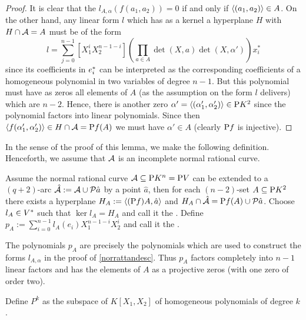 \begin{proof}
    It is clear that the $l_{A,\alpha}(f(a_1,a_2))=0$ if and only if $\gen{(a_1,a_2)}\in A$. On the other hand, any linear form $l$ which has as a kernel a hyperplane $H$ with $H\cap\mathcal{A}=A$ must be of the form
    $$
    l=\sum_{j=0}^{n-1}{[X_1^i X_2^{n-1-i}]\left(\prod_{a\in A}{\det(X,a)}\det(X,\alpha')\right)x_i^{\ast}}
    $$
    since its coefficients in $e^{\ast}_i$ can be interpreted as the corresponding coefficients of a homogeneous polynomial in two variables of degree $n-1$. But this polynomial must have as zeros all elements of $A$ (as the assumption on the form $l$ delivers) which are $n-2$. Hence, there is another zero $\alpha'=\gen{(\alpha'_1,\alpha'_2)}\in\proj{K^2}$ since the polynomial factors into linear polynomials. Since then $\gen{f(\alpha'_1,\alpha'_2)}\in H\setmeet\cA=\proj f(A)$ we must have $\alpha'\in A$ (clearly $\mathrm{P} f$ is injective).
    
\end{proof}

In the sense of the proof of this lemma, we make the following definition.
Henceforth, we assume that $\mathcal{A}$ is an incomplete normal rational curve.

\begin{definition}
    Assume the normal rational curve $\mathcal{A}\subseteq \mathrm{P}{K^n}=\mathrm{P}{V}$ can be extended to a $(q+2)$-arc $\hat{\cA}:=\cA\setjoin\set{\hat{a}}$ by a point $\hat a$, then for each $(n-2)$-set $A\subseteq\mathrm{P}{K^2}$ there exists a hyperplane $H_A:=\gen{(\proj f)A,\hat{a}}$ and $H_A\setmeet \hat{\cA}=\proj f(A)\setjoin\set{\hat{a}}$. Choose $l_A\in V^{\ast}$ such that $\ker{l_A}=H_A$ and call it the .
    Define $p_A:=\sum_{i=0}^{n-1}{l_A(e_i)X_1^{n-1-i}X_2^i}$ and call it the .
\end{definition}

\begin{remark}
    The polynomials $p_A$ are precisely the polynomials which are used to construct the forms $l_{A,\alpha}$ in the proof of \autoref{norrattandesc}. Thus $p_A$ factors completely into $n-1$ linear factors and has the elements of $A$ as a projective zeros (with one zero of order two).
\end{remark}

\begin{definition}
    Define $P^k$ as the subspace of $K[X_1,X_2]$ of homogeneous polynomials of degree $k$.
\end{definition}

